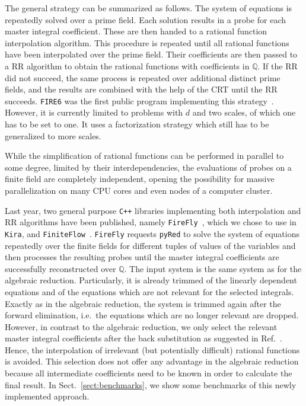 \documentclass[11pt,a4paper,DIV=11,numbers=noenddot,parskip=half]{scrartcl}
\newcommand{\code}[1]{\texttt{#1}}
\newcommand*{\kira}{\code{Kira}}
\begin{document}
The general strategy can be summarized as follows.
The system of equations is repeatedly solved over a prime field.
Each solution results in a probe for each master integral coefficient.
These are then handed to a rational function interpolation algorithm.
This procedure is repeated until all rational functions have been interpolated over the prime field.
Their coefficients are then passed to a RR algorithm to obtain the rational functions with coefficients in $\mathbb{Q}$.
If the RR did not succeed, the same process is repeated over additional distinct prime fields, and the results are combined with the help of the CRT until the RR succeeds.
\code{FIRE6} was the first public program implementing this strategy~\cite{Smirnov:2019qkx}.
However, it is currently limited to problems with $d$ and two scales, of which one has to be set to one.
It uses a factorization strategy which still has to be generalized to more scales.

While the simplification of rational functions can be performed in parallel to some degree, limited by their interdependencies, the evaluations of probes on a finite field are completely independent, opening the possibility for massive parallelization on many CPU cores and even nodes of a computer cluster.

Last year, two general purpose \code{C++} libraries implementing both interpolation and RR algorithms have been published, namely \code{FireFly}~\cite{Klappert:2019emp,Klappert:2020aqs}, which we chose to use in \kira{}, and \code{FiniteFlow}~\cite{Peraro:2019svx}.
\code{FireFly} requests \code{pyRed} to solve the system of equations repeatedly over the finite fields for different tuples of values of the variables and then processes the resulting probes until the master integral coefficients are successfully reconstructed over $\mathbb{Q}$.
The input system is the same system as for the algebraic reduction.
Particularly, it is already trimmed of the linearly dependent equations and of the equations which are not relevant for the selected integrals.
Exactly as in the algebraic reduction, the system is trimmed again after the forward elimination, i.e.\ the equations which are no longer relevant are dropped.
However, in contrast to the algebraic reduction, we only select the relevant master integral coefficients after the back substitution as suggested in Ref.~\cite{Klappert:2019emp}.
Hence, the interpolation of irrelevant (but potentially difficult) rational functions is avoided.
This selection does not offer any advantage in the algebraic reduction because all intermediate coefficients need to be known in order to calculate the final result.
In Sect.~\ref{sect:benchmarks}, we show some benchmarks of this newly implemented approach.
\end{document}
